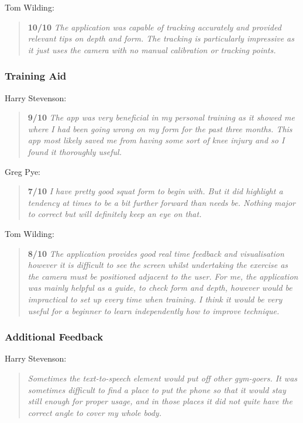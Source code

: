 Tom Wilding:
\begin{quote}
\textbf{10/10} \emph{The application was capable of tracking accurately and provided relevant tips on depth and form. The tracking is particularly impressive as it just uses the camera with no manual calibration or tracking points.}
\end{quote}

\subsubsection{Training Aid}

Harry Stevenson:
\begin{quote}
\textbf{9/10} \emph{The app was very beneficial in my personal training as it showed me where I had been going wrong on my form for the past three months. This app most likely saved me from having some sort of knee injury and so I found it thoroughly useful.}
\end{quote}

Greg Pye:
\begin{quote}
\textbf{7/10} \emph{I have pretty good squat form to begin with. But it did highlight a tendency at times to be a bit further forward than needs be. Nothing major to correct but will definitely keep an eye on that.}
\end{quote}

Tom Wilding:
\begin{quote}
\textbf{8/10} \emph{The application provides good real time feedback and visualisation however it is difficult to see the screen whilst undertaking the exercise as the camera must be positioned adjacent to the user. For me, the application was mainly helpful as a guide, to check form and depth, however would be impractical to set up every time when training. I think it would be very useful for a beginner to learn independently how to improve technique.}
\end{quote}

\subsubsection{Additional Feedback}

Harry Stevenson:
\begin{quote}
\emph{Sometimes the text-to-speech element would put off other gym-goers. It was sometimes difficult to find a place to put the phone so that it would stay still enough for proper usage, and in those places it did not quite have the correct angle to cover my whole body.}
\end{quote}

